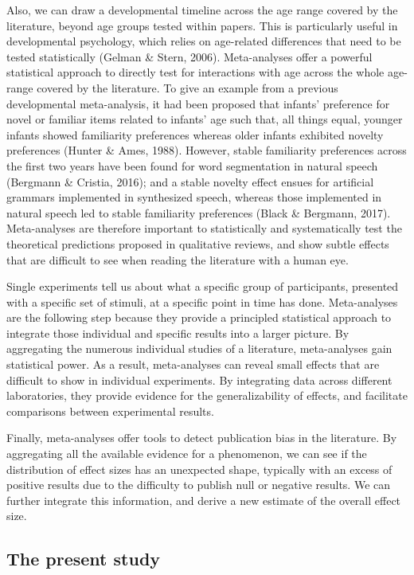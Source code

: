 \documentclass[
  english,
  man]{apa6}
\begin{document}
Also, we can draw a developmental timeline across the age range covered by the literature, beyond age groups tested within papers. This is particularly useful in developmental psychology, which relies on age-related differences that need to be tested statistically (Gelman \& Stern, 2006). Meta-analyses offer a powerful statistical approach to directly test for interactions with age across the whole age-range covered by the literature. To give an example from a previous developmental meta-analysis, it had been proposed that infants' preference for novel or familiar items related to infants' age such that, all things equal, younger infants showed familiarity preferences whereas older infants exhibited novelty preferences (Hunter \& Ames, 1988). However, stable familiarity preferences across the first two years have been found for word segmentation in natural speech (Bergmann \& Cristia, 2016); and a stable novelty effect ensues for artificial grammars implemented in synthesized speech, whereas those implemented in natural speech led to stable familiarity preferences (Black \& Bergmann, 2017). Meta-analyses are therefore important to statistically and systematically test the theoretical predictions proposed in qualitative reviews, and show subtle effects that are difficult to see when reading the literature with a human eye.

Single experiments tell us about what a specific group of participants, presented with a specific set of stimuli, at a specific point in time has done. Meta-analyses are the following step because they provide a principled statistical approach to integrate those individual and specific results into a larger picture. By aggregating the numerous individual studies of a literature, meta-analyses gain statistical power. As a result, meta-analyses can reveal small effects that are difficult to show in individual experiments. By integrating data across different laboratories, they provide evidence for the generalizability of effects, and facilitate comparisons between experimental results.

Finally, meta-analyses offer tools to detect publication bias in the literature. By aggregating all the available evidence for a phenomenon, we can see if the distribution of effect sizes has an unexpected shape, typically with an excess of positive results due to the difficulty to publish null or negative results. We can further integrate this information, and derive a new estimate of the overall effect size.

\hypertarget{the-present-study}{%
\subsection{The present study}\label{the-present-study}}
\end{document}
